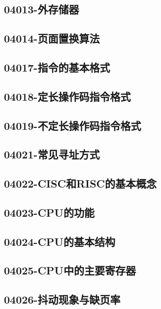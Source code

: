 \subsection{04013-外存储器}

\subsection{04014-页面置换算法}

\subsection{04017-指令的基本格式}

\subsection{04018-定长操作码指令格式}

\subsection{04019-不定长操作码指令格式}

\subsection{04021-常见寻址方式}

\subsection{04022-CISC和RISC的基本概念}

\subsection{04023-CPU的功能}

\subsection{04024-CPU的基本结构}

\subsection{04025-CPU中的主要寄存器}

\subsection{04026-抖动现象与缺页率}

